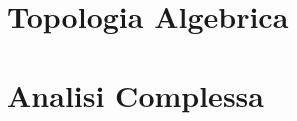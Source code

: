 \documentclass[a4paper, twoside]{book}
\begin{document}






\part{Topologia Algebrica}






\part{Analisi Complessa}



















%

%
%
\end{document}
